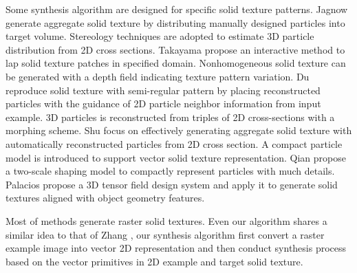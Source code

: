 Some synthesis algorithm are designed for specific solid texture patterns. 
Jagnow \etal \cite{jagnow2004stereological} generate aggregate solid texture by distributing manually designed particles into target volume. Stereology techniques are adopted to estimate 3D particle distribution from 2D cross sections.
Takayama \etal \cite{takayama2008lapped} propose an interactive method to lap solid texture patches in specified domain. Nonhomogeneous solid texture can be generated with a depth field indicating texture pattern variation. Du \etal \cite{du2013semiregular} reproduce solid texture with semi-regular pattern by placing reconstructed particles with the guidance of 2D particle neighbor information from input example. 3D particles is reconstructed from triples of 2D cross-sections with a morphing scheme.  Shu \etal \cite{shu2014efficient} focus on effectively generating aggregate solid texture with automatically reconstructed particles from 2D cross section. A compact particle model is introduced to support vector solid texture representation. Qian \etal \cite{qian2015vector} propose a two-scale shaping model to compactly represent particles with much details. Palacios \etal \cite{palacios2016tensor} propose a 3D tensor field design system and apply it to generate solid textures aligned with object geometry features.

Most of methods generate raster solid textures. Even our algorithm shares a similar idea to that of Zhang \etal \cite{zhang2013efficient}, our synthesis algorithm first convert a raster example image into vector 2D representation and then conduct synthesis process based on the vector primitives in 2D example and target solid texture.

